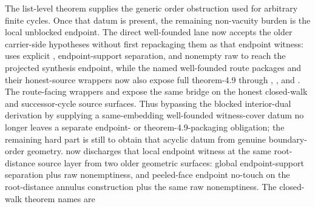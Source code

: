 \documentclass[11pt]{article}
\begin{document}
The list-level theorem
 supplies the generic
order obstruction used for arbitrary finite cycles.
Once that datum is
present, the remaining non-vacuity burden is the local unblocked endpoint.
The direct well-founded lane now accepts the older carrier-side hypotheses
without first repackaging them as that endpoint witness:
uses explicit ,
endpoint-support separation, and nonempty raw
 to reach the projected synthesis endpoint,
while the named well-founded route packages and their honest-source wrappers
now also expose full theorem-4.9 through
,
,
and
.
The route-facing wrappers
and
expose the same bridge on the honest closed-walk and successor-cycle source
surfaces.  Thus bypassing the blocked interior-dual derivation by supplying a
same-embedding well-founded witness-cover datum no longer leaves a separate
endpoint- or theorem-4.9-packaging obligation; the remaining hard part is still
to obtain that acyclic datum from genuine boundary-order geometry.
 now discharges
that local endpoint witness at the same root-distance source layer from two
older geometric surfaces: global endpoint-support separation plus raw
 nonemptiness, and peeled-face endpoint
no-touch on the root-distance annulus construction plus the same raw
nonemptiness.  The closed-walk theorem names are
\end{document}
